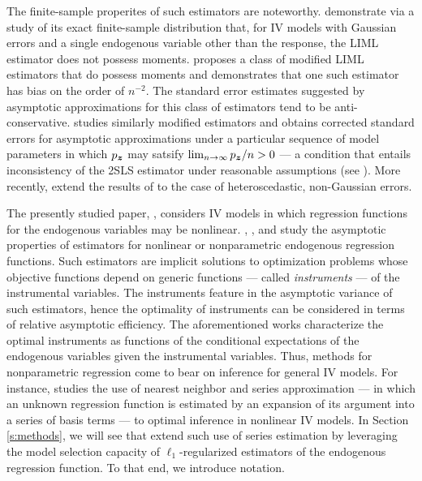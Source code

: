 \documentclass{uwstat572}
\theoremstyle{definition}
\theoremstyle{remark}
\numberwithin{equation}{section}
\begin{document}
The finite-sample properites of such estimators are noteworthy. \cite{MS72} demonstrate via a study of its exact finite-sample distribution that, for IV models with Gaussian errors and a single endogenous variable other than the response, the LIML estimator does not possess moments. \cite{F77} proposes a class of modified LIML estimators that do possess moments and demonstrates that one such estimator has bias on the order of $n^{-2}$. The standard error estimates suggested by asymptotic approximations for this class of estimators tend to be anti-conservative. \cite{B94} studies similarly modified estimators and obtains corrected standard errors for asymptotic approximations under a particular sequence of model parameters in which ${p_{\boldsymbol{z}}}$ may satsify $\lim_{n\to\infty} {p_{\boldsymbol{z}}}/n > 0$ --- a condition that entails inconsistency of the 2SLS estimator under reasonable assumptions (see \cite{BW11}).  More recently, \cite{HHN08} extend the results of \cite{B94} to the case of heteroscedastic, non-Gaussian errors.

The presently studied paper, \cite{BCH11}, considers IV models in which regression functions for the endogenous variables may be nonlinear.  \cite{A74}, \cite{A77}, \cite{H82} and \cite{C87} study the asymptotic properties of estimators for nonlinear or nonparametric endogenous regression functions. Such estimators are implicit solutions to optimization problems whose objective functions depend on generic functions --- called \emph{instruments} --- of the instrumental variables. The instruments feature in the asymptotic variance of such estimators, hence the optimality of instruments can be considered in terms of relative asymptotic efficiency. The aforementioned works characterize the optimal instruments as functions of the conditional expectations of the endogenous variables given the instrumental variables. Thus, methods for nonparametric regression come to bear on inference for general IV models. For instance, \cite{N90} studies the use of nearest neighbor and series approximation --- in which an unknown regression function is estimated by an expansion of its argument into a series of basis terms --- to optimal inference in nonlinear IV models. In Section \ref{s:methods}, we will see that \cite{BCH11} extend such use of series estimation by leveraging the model selection capacity of $\ell_1$-regularized estimators of the endogenous regression function. To that end, we introduce notation. 



%
\end{document}
